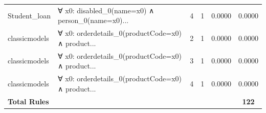\documentclass[11pt,a4paper]{article}
\begin{document}
\begin{table}[h!]
\begin{longtable}{|l|p{6cm}|c|c|c|c|}
Student_loan & ∀ x0: disabled\_0(name=x0) ∧ person\_0(name=x0)... & 4 & 1 & 0.0000 & 0.0000 \\
classicmodels & ∀ x0: orderdetails\_0(productCode=x0) ∧ product... & 2 & 1 & 0.0000 & 0.0000 \\
classicmodels & ∀ x0: orderdetails\_0(productCode=x0) ∧ product... & 3 & 1 & 0.0000 & 0.0000 \\
classicmodels & ∀ x0: orderdetails\_0(productCode=x0) ∧ product... & 4 & 1 & 0.0000 & 0.0000 \\
\hline
\textbf{Total Rules} & & & & & \textbf{122} \\
\hline
\end{longtable}
\end{table}
\end{document}
